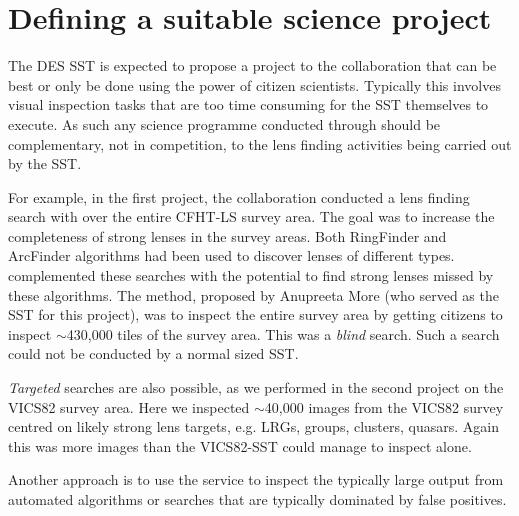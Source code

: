 \documentclass[a4paper,twocolumn]{article}
\begin{document}


\section{Defining a suitable \sw science project}
\label{sec:project}

The DES SST is expected to propose a project to the \SW collaboration that can be best or only be done using the power of citizen scientists. Typically this involves visual inspection tasks that are too time consuming for the SST themselves to execute. As such any science programme conducted through \SW should be complementary, not in competition, to the lens finding activities being carried out by the SST.

For example, in the first \SW project, the \SW collaboration conducted a lens finding search with \SW over the entire CFHT-LS survey area. The goal was to increase the completeness of strong lenses in the survey areas. Both RingFinder and ArcFinder algorithms had been used to discover lenses of different types. \SW complemented these searches with the potential to find strong lenses missed by these algorithms. The method, proposed by Anupreeta More (who served as the SST for this project), was to inspect the entire survey area by getting citizens to inspect $\sim$430,000 tiles of the survey area. This was a \textit{blind} search. Such a search could not be conducted by a normal sized SST.

\textit{Targeted} searches are also possible, as we performed in the second \SW project on the VICS82 survey area. Here we inspected $\sim$40,000 images from the VICS82 survey centred on likely strong lens targets, e.g. LRGs, groups, clusters, quasars.  Again this was more images than the VICS82-SST could manage to inspect alone.

Another approach is to use the \SW service to inspect the typically large output from automated algorithms or searches that are typically dominated by false positives.
\end{document}
